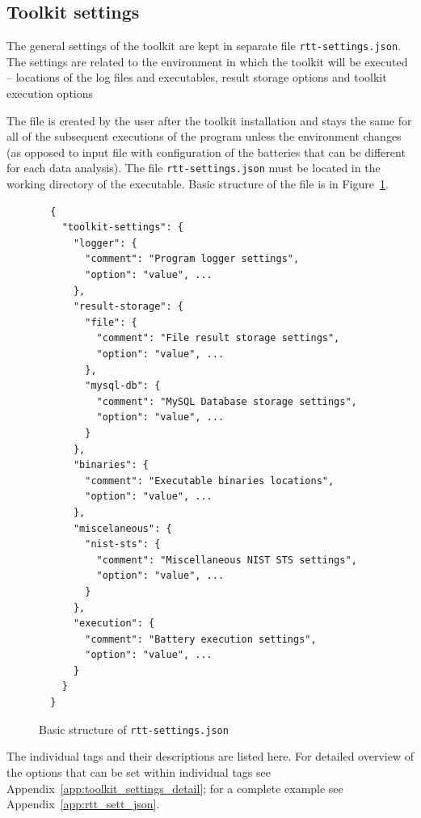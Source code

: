 \documentclass[
  digital,  	%
  color,		%
  oneside,   	%
  12pt,
  nocover,
  notable,
  nolof,
  nolot,
]{fithesis3}
\begin{document}
\subsection{Toolkit settings}
The general settings of the toolkit are kept in separate file \texttt{rtt-settings.json}. The settings are related to the environment in which the toolkit will be executed -- locations of the log files and executables, result storage options and toolkit execution options 

The file is created by the user after the toolkit installation and stays the same for all of the subsequent executions of the program unless the environment changes (as opposed to input file with configuration of the batteries that can be different for each data analysis). The file \texttt{rtt-settings.json} must be located in the working directory of the executable. Basic structure of the file is in Figure~\ref{fig:rtt_sett_short_json}.

\begin{figure}[h!]
\begin{verbatim}
  {
    "toolkit-settings": {
      "logger": {
        "comment": "Program logger settings",
        "option": "value", ...
      },
      "result-storage": {
        "file": {
          "comment": "File result storage settings",
          "option": "value", ...
        },
        "mysql-db": {
          "comment": "MySQL Database storage settings",
          "option": "value", ...
        }
      },
      "binaries": {
        "comment": "Executable binaries locations",
        "option": "value", ...
      },    
      "miscelaneous": {
        "nist-sts": {
          "comment": "Miscellaneous NIST STS settings",
          "option": "value", ...
        }
      },
      "execution": {
        "comment": "Battery execution settings",
        "option": "value", ...
      }
    }
  }
\end{verbatim}
\caption{Basic structure of \texttt{rtt-settings.json}}
\label{fig:rtt_sett_short_json}
\end{figure}

The individual tags and their descriptions are listed here. For detailed overview of the options that can be set within individual tags see Appendix~\ref{app:toolkit_settings_detail}; for a complete example see Appendix~\ref{app:rtt_sett_json}. 
\end{document}
